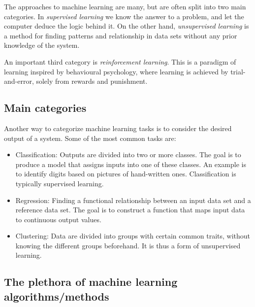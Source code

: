 \documentclass[%
oneside,                 %
final,                   %
10pt]{article}
\begin{document}
\begin{block}{}
The approaches to machine learning are many, but are often split into two main categories. 
In \emph{supervised learning} we know the answer to a problem,
and let the computer deduce the logic behind it. On the other hand, \emph{unsupervised learning}
is a method for finding patterns and relationship in data sets without any prior knowledge of the system.

An important  third category is  \emph{reinforcement learning}. This is a paradigm 
of learning inspired by behavioural psychology, where learning is achieved by trial-and-error, 
solely from rewards and punishment.
\end{block}

\subsection{Main categories}
\begin{block}{}
Another way to categorize machine learning tasks is to consider the desired output of a system.
Some of the most common tasks are:

\begin{itemize}
  \item Classification: Outputs are divided into two or more classes. The goal is to   produce a model that assigns inputs into one of these classes. An example is to identify  digits based on pictures of hand-written ones. Classification is typically supervised learning.

  \item Regression: Finding a functional relationship between an input data set and a reference data set.   The goal is to construct a function that maps input data to continuous output values.

  \item Clustering: Data are divided into groups with certain common traits, without knowing the different groups beforehand.  It is thus a form of unsupervised learning.
\end{itemize}

\noindent
\end{block}

\subsection{The plethora  of machine learning algorithms/methods}
\end{document}
